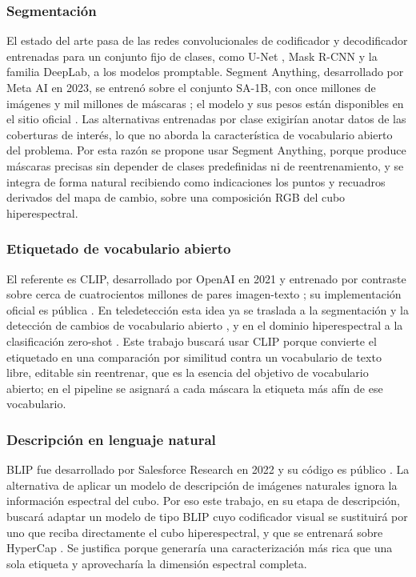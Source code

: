 \subsubsection{Segmentación}

El estado del arte pasa de las redes convolucionales de codificador y decodificador entrenadas para un conjunto fijo de clases, como U-Net \parencite{ronneberger2015unet}, Mask R-CNN \parencite{he2017maskrcnn} y la familia DeepLab, a los modelos promptable. Segment Anything, desarrollado por Meta AI en 2023, se entrenó sobre el conjunto SA-1B, con once millones de imágenes y mil millones de máscaras \parencite{kirillov2023sam}; el modelo y sus pesos están disponibles en el sitio oficial \parencite{meta2023sam_repo}. Las alternativas entrenadas por clase exigirían anotar datos de las coberturas de interés, lo que no aborda la característica de vocabulario abierto del problema. Por esta razón se propone usar Segment Anything, porque produce máscaras precisas sin depender de clases predefinidas ni de reentrenamiento, y se integra de forma natural recibiendo como indicaciones los puntos y recuadros derivados del mapa de cambio, sobre una composición RGB del cubo hiperespectral.

\subsubsection{Etiquetado de vocabulario abierto}

El referente es CLIP, desarrollado por OpenAI en 2021 y entrenado por contraste sobre cerca de cuatrocientos millones de pares imagen-texto \parencite{radford2021clip}; su implementación oficial es pública \parencite{openai2021clip_repo}. En teledetección esta idea ya se traslada a la segmentación y la detección de cambios de vocabulario abierto \parencite{kombol2025trainingfree,zhu2025semanticcd}, y en el dominio hiperespectral a la clasificación zero-shot \parencite{pang2025special}. Este trabajo buscará usar CLIP porque convierte el etiquetado en una comparación por similitud contra un vocabulario de texto libre, editable sin reentrenar, que es la esencia del objetivo de vocabulario abierto; en el pipeline se asignará a cada máscara la etiqueta más afín de ese vocabulario.

\subsubsection{Descripción en lenguaje natural}

BLIP fue desarrollado por Salesforce Research en 2022 y su código es público \parencite{salesforce2022blip_repo}. La alternativa de aplicar un modelo de descripción de imágenes naturales ignora la información espectral del cubo. Por eso este trabajo, en su etapa de descripción, buscará adaptar un modelo de tipo BLIP \parencite{li2022blip} cuyo codificador visual se sustituirá por uno que reciba directamente el cubo hiperespectral, y que se entrenará sobre HyperCap \parencite{das2025hypercap}. Se justifica porque generaría una caracterización más rica que una sola etiqueta y aprovecharía la dimensión espectral completa.

